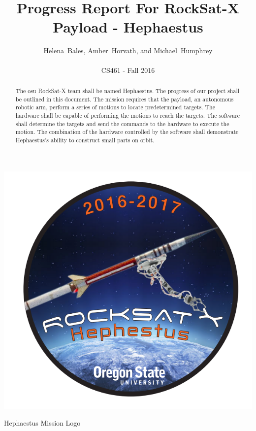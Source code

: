 \documentclass[letterpaper,10pt]{article}
\title{Progress Report For RockSat-X Payload - Hephaestus}
\author{Helena~Bales, Amber~Horvath, and Michael~Humphrey\\ \\ CS461 - Fall 2016}
\begin{document}
\maketitle

\begin{abstract}
The \gls{osu} RockSat-X team shall be named Hephaestus.
The progress of our project shall be outlined in this document.
The mission requires that the \gls{payload}, an autonomous robotic arm, perform a series of motions to locate predetermined targets.
The hardware shall be capable of performing the motions to reach the targets.
The software shall determine the targets and send the commands to the hardware to execute the motion.
The combination of the hardware controlled by the software shall demonstrate Hephaestus's ability to construct small parts on orbit.
\end{abstract}

\begin{center}
\includegraphics[scale=.3]{logo}

Hephaestus Mission Logo
\end{center}
\end{document}

